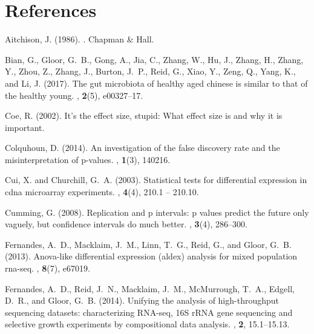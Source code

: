 \documentclass[11pt]{article}
\begin{document}
\section*{References}


\begin{thebibliography}{}

Aitchison, J. (1986).
.
\newblock Chapman \& Hall.

Bian, G., Gloor, G.~B., Gong, A., Jia, C., Zhang, W., Hu, J., Zhang, H., Zhang,
  Y., Zhou, Z., Zhang, J., Burton, J.~P., Reid, G., Xiao, Y., Zeng, Q., Yang,
  K., and Li, J. (2017).
\newblock The gut microbiota of healthy aged chinese is similar to that of the
  healthy young.
, {\bf 2}(5), e00327--17.

Coe, R. (2002).
\newblock It's the effect size, stupid: What effect size is and why it is
  important.

Colquhoun, D. (2014).
\newblock An investigation of the false discovery rate and the
  misinterpretation of p-values.
, {\bf 1}(3), 140216.

Cui, X. and Churchill, G.~A. (2003).
\newblock Statistical tests for differential expression in cdna microarray
  experiments.
, {\bf 4}(4), 210.1 -- 210.10.

Cumming, G. (2008).
\newblock Replication and p intervals: p values predict the future only
  vaguely, but confidence intervals do much better.
, {\bf 3}(4), 286--300.

Fernandes, A.~D., Macklaim, J.~M., Linn, T.~G., Reid, G., and Gloor, G.~B.
  (2013).
\newblock Anova-like differential expression (aldex) analysis for mixed
  population rna-seq.
, {\bf 8}(7), e67019.

Fernandes, A.~D., Reid, J.~N., Macklaim, J.~M., McMurrough, T.~A., Edgell,
  D.~R., and Gloor, G.~B. (2014).
\newblock Unifying the analysis of high-throughput sequencing datasets:
  characterizing {RNA}-seq, 16{S} r{RNA} gene sequencing and selective growth
  experiments by compositional data analysis.
, {\bf 2}, 15.1--15.13.


\end{thebibliography}
\end{document}
